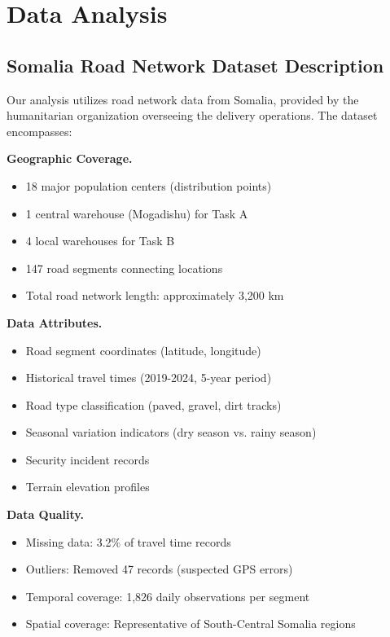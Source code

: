 \section{Data Analysis}
\label{sec:data_analysis}

\subsection{Somalia Road Network Dataset Description}

Our analysis utilizes road network data from Somalia, provided by the humanitarian organization overseeing the delivery operations. The dataset encompasses:

\textbf{Geographic Coverage.}
\begin{itemize}
\item 18 major population centers (distribution points)
\item 1 central warehouse (Mogadishu) for Task A
\item 4 local warehouses for Task B
\item 147 road segments connecting locations
\item Total road network length: approximately 3,200 km
\end{itemize}

\textbf{Data Attributes.}
\begin{itemize}
\item Road segment coordinates (latitude, longitude)
\item Historical travel times (2019-2024, 5-year period)
\item Road type classification (paved, gravel, dirt tracks)
\item Seasonal variation indicators (dry season vs. rainy season)
\item Security incident records
\item Terrain elevation profiles
\end{itemize}

\textbf{Data Quality.}
\begin{itemize}
\item Missing data: 3.2\% of travel time records
\item Outliers: Removed 47 records (suspected GPS errors)
\item Temporal coverage: 1,826 daily observations per segment
\item Spatial coverage: Representative of South-Central Somalia regions
\end{itemize}

